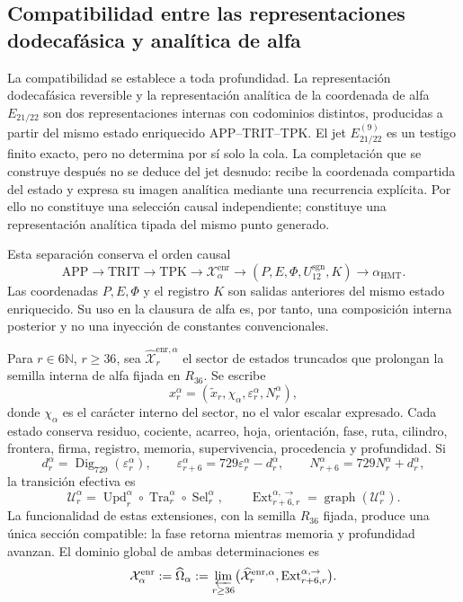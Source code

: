 \subsection{Compatibilidad entre las representaciones dodecafásica y analítica de alfa}
\label{subsec:alpha-publicaciones-completas}

La compatibilidad se establece a toda profundidad. La representación
dodecafásica reversible y la representación analítica de la
coordenada de alfa
\(E_{21/22}\) son dos representaciones internas con codominios distintos,
producidas a partir del mismo estado enriquecido APP--TRIT--TPK. El jet
\(E_{21/22}^{(9)}\) es un testigo finito exacto, pero no determina por sí solo
la cola. La completación que se construye después no se deduce del jet
desnudo: recibe la coordenada compartida del estado y expresa su imagen
analítica mediante una recurrencia explícita. Por ello no constituye una
selección causal independiente; constituye una representación analítica
tipada del mismo punto generado.

Esta separación conserva el orden causal
\[
 \mathrm{APP}\longrightarrow\mathrm{TRIT}\longrightarrow\mathrm{TPK}
 \longrightarrow\mathcal X_{\alpha}^{\mathrm{enr}}
 \longrightarrow (P,E,\Phi,U_{12}^{\mathrm{sgn}},K)
 \longrightarrow\alpha_{\mathrm{HMT}}.
\]
Las coordenadas \(P,E,\Phi\) y el registro \(K\) son salidas anteriores del
mismo estado enriquecido. Su uso en la clausura de alfa es, por tanto, una
composición interna posterior y no una inyección de constantes
convencionales.

Para \(r\in6\mathbb N\), \(r\ge36\), sea
\(\widehat{\mathcal X}^{\mathrm{enr},\alpha}_r\) el sector de estados
truncados que prolongan la semilla interna de alfa fijada en \(R_{36}\). Se
escribe
\[
 x_r^\alpha=(\widetilde x_r,\chi_\alpha,
              \varepsilon_r^\alpha,N_r^\alpha),
\]
donde \(\chi_\alpha\) es el carácter interno del sector, no el valor escalar
expresado. Cada estado conserva residuo, cociente, acarreo, hoja, orientación,
fase, ruta, cilindro, frontera, firma, registro, memoria, supervivencia,
procedencia y profundidad. Si
\[
 d_r^\alpha=\operatorname{Dig}_{729}(\varepsilon_r^\alpha),\qquad
 \varepsilon_{r+6}^\alpha=729\varepsilon_r^\alpha-d_r^\alpha,
 \qquad N_{r+6}^\alpha=729N_r^\alpha+d_r^\alpha,
\]
la transición efectiva es
\[
 \mathcal U_r^\alpha=
 \operatorname{Upd}_r^\alpha\circ
 \operatorname{Tra}_r^\alpha\circ
 \operatorname{Sel}_r^\alpha,
 \qquad
 \operatorname{Ext}^{\alpha,\to}_{r+6,r}
 =\operatorname{graph}(\mathcal U_r^\alpha).
\]
La funcionalidad de estas extensiones, con la semilla \(R_{36}\) fijada,
produce una única sección compatible: la fase retorna mientras memoria y
profundidad avanzan. El dominio global de ambas determinaciones es
\begin{equation}
 \mathcal X_\alpha^{\mathrm{enr}}:=\widehat\Omega_\alpha
 :=\varprojlim_{r\ge36}
 \bigl(\widehat{\mathcal X}^{\mathrm{enr},\alpha}_r,
       \operatorname{Ext}^{\alpha,\to}_{r+6,r}\bigr).
 \label{eq:alpha-dominio-enriquecido-completo}
\end{equation}

